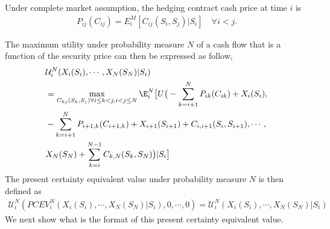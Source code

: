 {\proposition Under complete market assumption, the hedging contract cash price at time $i$ is
\begin{align}
P_{ij}(C_{ij}) = E_i^M[C_{ij}(S_i,S_j)|S_i] \quad \forall i< j.
\end{align}
}

The maximum utility under probability measure $N$ of a cash flow that is a function of the security price can then be expressed as follow,
\begin{align}
&\mathcal{U}^N_i (X_i(S_i),\cdots, X_N(S_N)|S_i) \\&= \max_{C_{kj}(S_k,S_j) \forall i\leq k <j, i< j \leq N} \E_i^N \big{[}U\big{(}- \sum_{k=i+1}^N P_{ik} (C_{ik})+X_i(S_i), \nonumber \\ &-\sum_{k=i+1}^N P_{i+1,k} (C_{i+1,k})+X_{i+1}(S_{i+1}) + C_{i,i+1}(S_i,S_{i+1}), \cdots, \nonumber\\&
X_N(S_N) + \sum_{k=i}^{N-1} C_{k,N}(S_k,S_N) \big{)}|S_i\big{]} \nonumber
\end{align}
The present certainty equivalent value under probability measure $N$ is then  defined as
\begin{align}
\mathcal{U}^N_i(PCEV_i^N(X_i(S_i),\cdots,X_N(S_N)|S_i), 0, \cdots, 0) = \mathcal{U}^N_i (X_i(S_i),\cdots, X_N(S_N)|S_i) 
\end{align}
We next show what is the format of this present certainty equivalent value. 

